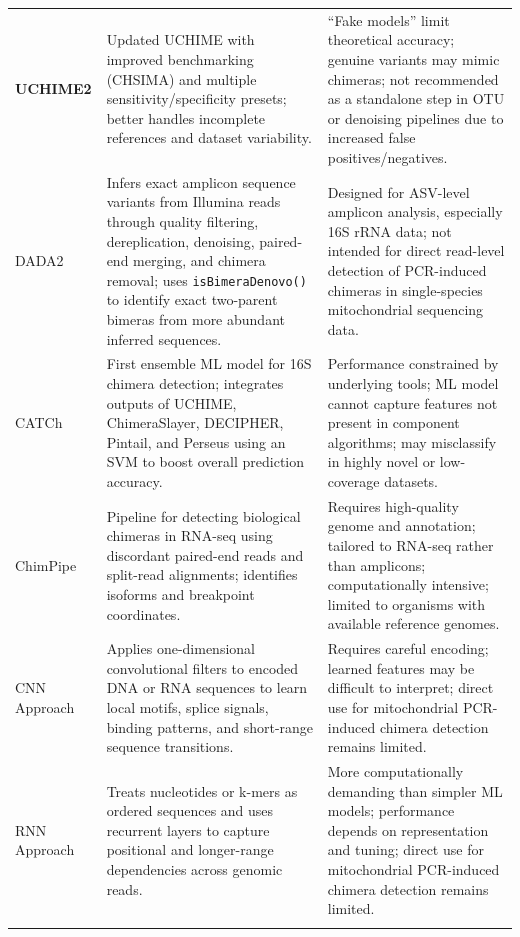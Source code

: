 \begin{landscape}
\begin{xltabular}{\linewidth}{>{\bfseries}p{3.2cm} X X}
    UCHIME2 &
    Updated UCHIME with improved benchmarking (CHSIMA) and multiple sensitivity/specificity presets; better handles incomplete references and dataset variability. &
    ``Fake models'' limit theoretical accuracy; genuine variants may mimic chimeras; not recommended as a standalone step in OTU or denoising pipelines due to increased false positives/negatives. \\
    \addlinespace

    DADA2 &
    Infers exact amplicon sequence variants from Illumina reads through quality filtering, dereplication, denoising, paired-end merging, and chimera removal; uses \texttt{isBimeraDenovo()} to identify exact two-parent bimeras from more abundant inferred sequences. &
    Designed for ASV-level amplicon analysis, especially 16S rRNA data; not intended for direct read-level detection of PCR-induced chimeras in single-species mitochondrial sequencing data. \\
    \addlinespace

    CATCh &
    First ensemble ML model for 16S chimera detection; integrates outputs of UCHIME, ChimeraSlayer, DECIPHER, Pintail, and Perseus using an SVM to boost overall prediction accuracy. &
    Performance constrained by underlying tools; ML model cannot capture features not present in component algorithms; may misclassify in highly novel or low-coverage datasets. \\
    \addlinespace

    ChimPipe &
    Pipeline for detecting biological chimeras in RNA-seq using discordant paired-end reads and split-read alignments; identifies isoforms and breakpoint coordinates. &
    Requires high-quality genome and annotation; tailored to RNA-seq rather than amplicons; computationally intensive; limited to organisms with available reference genomes. \\
    \addlinespace

    CNN Approach &
    Applies one-dimensional convolutional filters to encoded DNA or RNA sequences to learn local motifs, splice signals, binding patterns, and short-range sequence transitions. &
    Requires careful encoding; learned features may be difficult to interpret; direct use for mitochondrial PCR-induced chimera detection remains limited. \\
    \addlinespace

    RNN Approach &
    Treats nucleotides or k-mers as ordered sequences and uses recurrent layers to capture positional and longer-range dependencies across genomic reads. &
    More computationally demanding than simpler ML models; performance depends on representation and tuning; direct use for mitochondrial PCR-induced chimera detection remains limited. \\
    \addlinespace


\end{xltabular}
\end{landscape}
